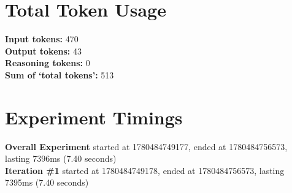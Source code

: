 \documentclass{article}
\begin{document}
\section*{Total Token Usage}
\textbf{Input tokens: }470
\\\textbf{Output tokens: }43
\\\textbf{Reasoning tokens: }0
\\\textbf{Sum of `total tokens': }513
\section*{Experiment Timings}
\textbf{Overall Experiment} started at 1780484749177, ended at 1780484756573, lasting 7396ms (7.40 seconds)
\\\textbf{Iteration \#1} started at 1780484749178, ended at 1780484756573, lasting 7395ms (7.40 seconds)
\end{document}
